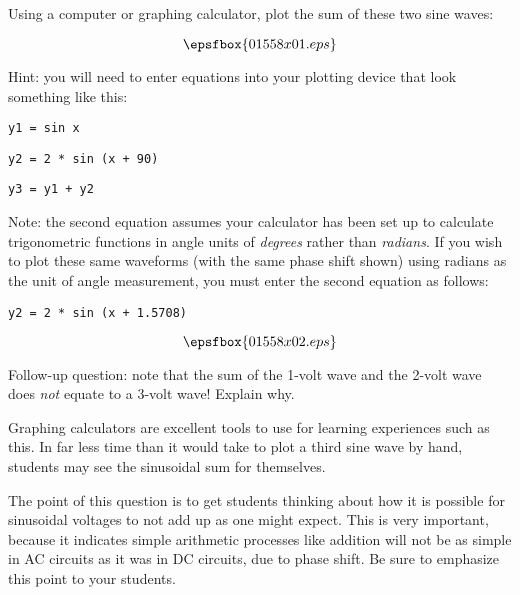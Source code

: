 

Using a computer or graphing calculator, plot the sum of these two sine waves:

$$\epsfbox{01558x01.eps}$$

Hint: you will need to enter equations into your plotting device that look something like this:

\vskip 10pt

\goodbreak

{\tt y1 = sin x}

\vskip 10pt

{\tt y2 = 2 * sin (x + 90)}

\vskip 10pt

{\tt y3 = y1 + y2}

\vskip 10pt

Note: the second equation assumes your calculator has been set up to calculate trigonometric functions in angle units of {\it degrees} rather than {\it radians}.  If you wish to plot these same waveforms (with the same phase shift shown) using radians as the unit of angle measurement, you must enter the second equation as follows:

\vskip 10pt

{\tt y2 = 2 * sin (x + 1.5708)}

\vskip 10pt







$$\epsfbox{01558x02.eps}$$

\vskip 10pt

Follow-up question: note that the sum of the 1-volt wave and the 2-volt wave does {\it not} equate to a 3-volt wave!  Explain why.







Graphing calculators are excellent tools to use for learning experiences such as this.  In far less time than it would take to plot a third sine wave by hand, students may see the sinusoidal sum for themselves.

The point of this question is to get students thinking about how it is possible for sinusoidal voltages to not add up as one might expect.  This is very important, because it indicates simple arithmetic processes like addition will not be as simple in AC circuits as it was in DC circuits, due to phase shift.  Be sure to emphasize this point to your students.





